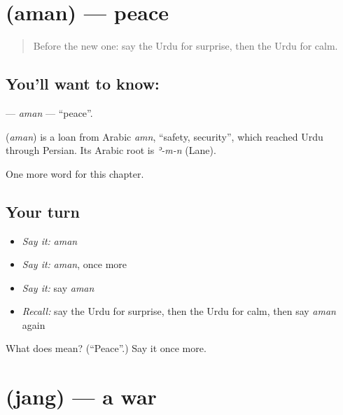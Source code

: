 \section[\texorpdfstring{\ur{امن} (aman)}{امن (aman)}]{ (aman) — peace}

\label{lesson:UR-C172-aman}



\begin{quote}
Before the new one: say the Urdu for surprise, then the Urdu for calm.
\end{quote}

\subsection*{You'll want to know: }
\textbf{} — \emph{aman} — \textquotedblleft{}peace\textquotedblright{}.

\begin{cousinweb}
\textbf{} (\emph{aman}) is a loan from Arabic \emph{amn}, \textquotedblleft{}safety, security\textquotedblright{}, which reached Urdu through Persian. Its Arabic root is \emph{ʾ-m-n} (Lane).
\end{cousinweb}

\begin{grammarlens}[title={What you've built}]
One more word for this chapter.
\end{grammarlens}

\subsection*{Your turn}
\begin{itemize}
\raggedright
  \item \emph{Say it:} \emph{aman}
  \item \emph{Say it:} \emph{aman}, once more
  \item \emph{Say it:} say \emph{aman}
  \item \emph{Recall:} say the Urdu for surprise, then the Urdu for calm, then say \emph{aman} again
\end{itemize}

\begin{tcolorbox}[breakable,colback=teal!4,colframe=teal!35!black,title={Before you move on}]
What does  mean? (\textquotedblleft{}Peace\textquotedblright{}.) Say it once more.
\end{tcolorbox}
\section[\texorpdfstring{\ur{جنگ} (jang)}{جنگ (jang)}]{ (jang) — a war}

